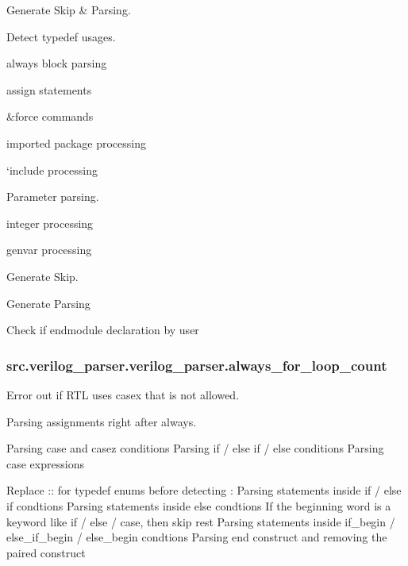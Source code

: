 Generate Skip \& Parsing. 

Detect typedef usages.

always block parsing

assign statements

\&force commands

imported package processing

`include processing

Parameter parsing.

integer processing

genvar processing

Generate Skip.

Generate Parsing

Check if endmodule declaration by user \hypertarget{classsrc_1_1verilog__parser_1_1verilog__parser_a7d3f4749a1f69f8a1cf2c00b4d96f82e}{
\subsubsection[{always\-\_\-for\-\_\-loop\-\_\-count}]{\setlength{\rightskip}{0pt plus 5cm}src.\-verilog\-\_\-parser.\-verilog\-\_\-parser.\-always\-\_\-for\-\_\-loop\-\_\-count}}\label{classsrc_1_1verilog__parser_1_1verilog__parser_a7d3f4749a1f69f8a1cf2c00b4d96f82e}


Error out if R\-T\-L uses casex that is not allowed. 

Parsing assignments right after always.

Parsing case and casez conditions Parsing if / else if / else conditions Parsing case expressions

Replace \-:\-: for typedef enums before detecting \-: Parsing statements inside if / else if condtions Parsing statements inside else condtions If the beginning word is a keyword like if / else / case, then skip rest Parsing statements inside if\-\_\-begin / else\-\_\-if\-\_\-begin / else\-\_\-begin condtions Parsing end construct and removing the paired construct

